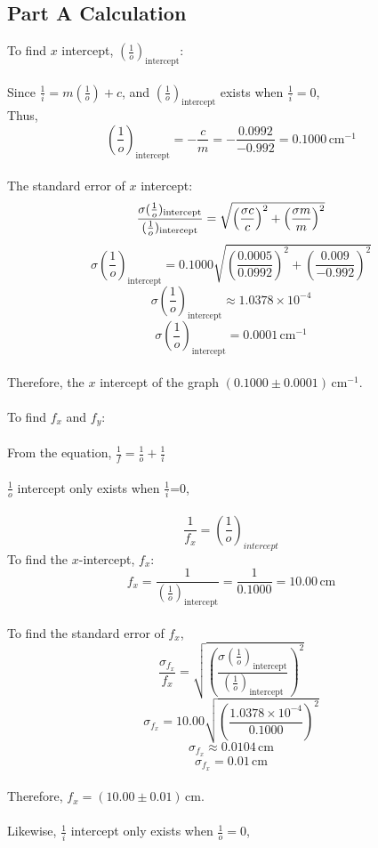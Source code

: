 \documentclass[a4paper,11pt]{article}
\begin{document}
\subsection*{Part A Calculation}
To find $x$ intercept, $(\frac{1}{o})_{\text{intercept}}$:\\
~\\
Since $\frac{1}{i} = m\left(\frac{1}{o}\right) + c$, and $(\frac{1}{o})_{\text{intercept}}$ exists when $\frac{1}{i} = 0$,\\
Thus,
\[
(\frac{1}{o})_{\text{intercept}} = -\frac{c}{m} = -\frac{0.0992}{-0.992} = 0.1000\, \text{cm}^{-1}
\]
~\\
The standard error of $x$ intercept:
~\\
\[
\\
\frac{\sigma(\frac{1}{o})_{\text{intercept}}}{(\frac{1}{o})_{\text{intercept}}} = \sqrt{\left(\frac{\sigma c}{c}\right)^2 + \left(\frac{\sigma m}{m}\right)^2}
\]
\[
\sigma(\frac{1}{o})_{\text{intercept}}= 0.1000\sqrt{\left(\frac{0.0005}{0.0992}\right)^2 + \left(\frac{0.009}{-0.992}\right)^2}
\]
\[
\sigma(\frac{1}{o})_{\text{intercept}} \approx 1.0378 \times 10^{-4}
\]
\[
\sigma(\frac{1}{o})_{\text{intercept}} = 0.0001 \,\text{cm}^{-1}
\]
~\\
Therefore, the $x$ intercept of the graph $(0.1000 \pm 0.0001)\, \text{cm}^{-1}$.\\
~\\
To find $f_x$ and $f_y$:\\
~\\
From the equation, $\frac{1}{f} = \frac{1}{o} + \frac{1}{i}$\\
~\\
$\frac{1}{o}$ intercept only exists when $\frac{1}{i}$=0,\\
~\\
\[
\frac{1}{f_x}=(\frac{1}{o})_{intercept}
\]
To find the $x$-intercept, $f_x$:
\[ f_x = \frac{1}{(\frac{1}{o})_{\text{intercept}}} = \frac{1}{0.1000} = 10.00\,\text{cm} \]
~\\
To find the standard error of $f_x$,
\[ \frac{\sigma_{f_x}}{f_x} = \sqrt{\left( \frac{\sigma(\frac{1}{o})_{\text{intercept}}}{(\frac{1}{o})_{\text{intercept}}} \right)^2} \]
\[ \sigma_{f_x} = 10.00\sqrt{\left( \frac{1.0378 \times 10^{-4}}{0.1000} \right)^2} \]
\[ \sigma_{f_x} \approx 0.0104\, \text{cm} \]
\[ \sigma_{f_x} =0.01\, \text{cm} \]
\\
Therefore, $f_x = (10.00 \pm 0.01)\, \text{cm}$.\\
\\
Likewise, $\frac{1}{i}$ intercept only exists when $\frac{1}{o} = 0$,\\
\end{document}
